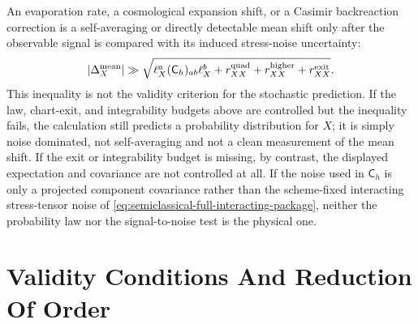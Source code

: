 \begin{controlledapproximation}
An evaporation rate, a cosmological expansion shift, or a Casimir
backreaction correction is a self-averaging or directly detectable mean shift
only after the observable signal is compared with its induced stress-noise
uncertainty:
\begin{equation}
  |\Delta_X^{\rm mean}|
  \gg
  \sqrt{
	    \ell_X^a(\mathsf C_h)_{ab}\ell_X^b
	    +r_{XX}^{\rm quad}
	    +r_{XX}^{\rm higher}
	    +r_{XX}^{\rm exit}
	  } .
  \label{eq:semiclassical-observable-signal-to-noise}
\end{equation}
This inequality is not the validity criterion for the stochastic prediction.
If the law, chart-exit, and integrability budgets above are controlled but the
inequality fails, the calculation still predicts a probability distribution
for \(X\); it is simply noise dominated, not self-averaging and not a clean
measurement of the mean shift.  If the exit or integrability budget is missing,
by contrast, the displayed expectation and covariance are not controlled at
all.  If the noise used in \(\mathsf C_h\) is only a projected component
covariance rather than the scheme-fixed interacting stress-tensor noise of
\eqref{eq:semiclassical-full-interacting-package}, neither the probability law
nor the signal-to-noise test is the physical one.
\end{controlledapproximation}

\section{Validity Conditions And Reduction Of Order}

